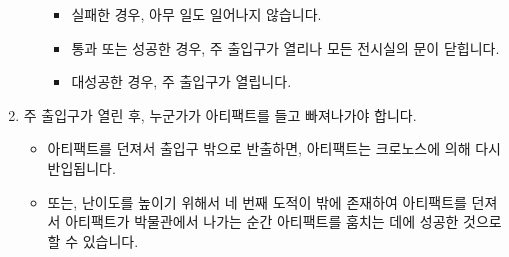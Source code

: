 \documentclass{report}
\begin{document}
\begin{enumerate}
\begin{itemize}
\begin{itemize}
				\item 실패한 경우, 아무 일도 일어나지 않습니다.
				\item 통과 또는 성공한 경우, 주 출입구가 열리나 모든 전시실의 문이 닫힙니다.
				\item 대성공한 경우, 주 출입구가 열립니다.
			\end{itemize}
		\end{itemize}
		\item 주 출입구가 열린 후, 누군가가 아티팩트를 들고 빠져나가야 합니다.
		\begin{itemize}
			\item 아티팩트를 던져서 출입구 밖으로 반출하면, 아티팩트는 크로노스에 의해 다시 반입됩니다.
			\item 또는, 난이도를 높이기 위해서 네 번째 도적이 밖에 존재하여 아티팩트를 던져서 아티팩트가 박물관에서 나가는 순간 아티팩트를 훔치는 데에 성공한 것으로 할 수 있습니다.
		\end{itemize}
	\end{enumerate}
	
\end{document}
